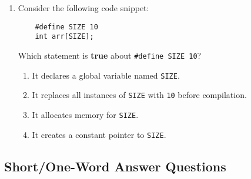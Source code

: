 \documentclass[a4paper,12pt]{article}
\begin{document}
\begin{enumerate}
  \item Consider the following code snippet:
  \begin{verbatim}
    #define SIZE 10
    int arr[SIZE];
  \end{verbatim}
  Which statement is \textbf{true} about \texttt{\#define SIZE 10}?
  \begin{enumerate}[label=(\alph*)]
    \item It declares a global variable named \texttt{SIZE}.
    \item It replaces all instances of \texttt{SIZE} with \texttt{10} before compilation.
    \item It allocates memory for \texttt{SIZE}.
    \item It creates a constant pointer to \texttt{SIZE}.
  \end{enumerate}
\end{enumerate}

\hrulefill

\vspace{1em}
\subsection*{Short/One-Word Answer Questions}
\end{document}
